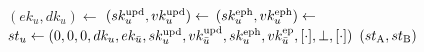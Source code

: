 \algrenewcommand\textproc{}
\algrenewcommand{}
\begin{minipage}{\linewidth}
  {\fontsize{10}{12}\selectfont
  \begin{algorithmic}[1]
      \State $(ek_u,dk_u) \gets$ 
      \State $(sk_u^\text{upd},vk_u^\text{upd}) \gets$ 
      \State $(sk_u^\text{eph},vk_u^\text{eph}) \gets$ 
    \EndFor
    \State $st_u \gets (0,0,0,dk_u,ek_{\bar{u}},sk_u^\text{upd},vk_{\bar{u}}^\text{upd},
                        sk_u^\text{eph},vk_{\bar{u}}^\text{ep},[\cdot],\perp,[\cdot])$
    \EndFor
    \State \Return $(st_\text{A},st_\text{B})$
    \EndProcedure
   \end{algorithmic}
  }
\end{minipage}
